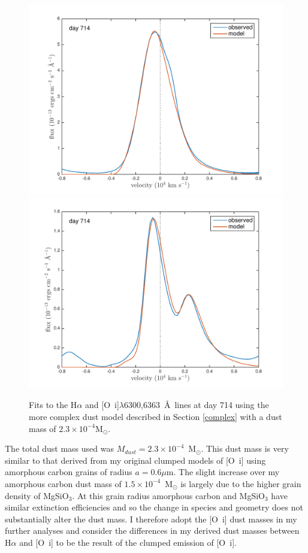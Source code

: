 \begin{figure}
\centering
\includegraphics[scale=0.42,clip=true,trim=40 0 40 20]{chapters/chapter5/images/HaOImod_Ha.pdf}
\includegraphics[scale=0.42, clip=true,trim=20 0 40 20]{chapters/chapter5/images/HaOImod_OI.pdf}
\caption{Fits to the H$\alpha$ and [O~{\sc i}]$\lambda$6300,6363~\AA\ lines at day 714 using the more complex dust model described in Section \ref{complex} with a dust mass of  $2.3 \times 10^{-4}$M$_{\odot}$.}
\label{HaOImod}
\end{figure}

The total dust mass used was $M_{dust}=2.3 \times 10^{-4}$~M$_{\odot}$.  This dust mass is very similar to that derived from my original clumped models of [O~{\sc i}] using amorphous carbon grains of radius $a=0.6\mu$m.  The slight increase over my amorphous carbon dust mass of $1.5 \times 10^{-4}$~M$_{\odot}$ is largely due to the higher grain density of MgSiO$_3$.  At this grain radius amorphous carbon and MgSiO$_3$ have similar extinction efficiencies and so the change in species and geometry does not substantially alter the dust mass. I therefore adopt the [O~{\sc i}] dust masses in my further analyses and consider the differences in my derived dust masses between H$\alpha$ and [O~{\sc i}] to be the result of the clumped emission of [O~{\sc i}].


